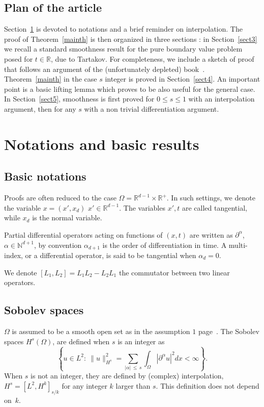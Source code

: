 \documentclass[AHL,Unicode,longabstracts,published]{cedram}
\newcommand{\R}{\mathbb{R}}
\newcommand{\N}{\mathbb{N}}
\newcommand{\N}{\mathbb{N}}
\begin{document}
\subsection{Plan of the article}
Section~\ref{notations} is devoted to notations and a brief reminder on interpolation. The proof of Theorem~\ref{mainth} is then organized in three sections : in Section~\ref{sect3} we recall a standard smoothness result for the pure boundary value problem posed for $t\in \R$, due to Tartakov. For completeness, we include a sketch of proof that follows an argument of the (unfortunately depleted) book~\cite{ChaPi}. Theorem~\ref{mainth} in the case $s$ integer is proved in Section~\ref{sect4}. An important point is a basic lifting lemma which proves to be also useful for the general case. In Section~\ref{sect5}, smoothness is first proved for $0\leq s\leq 1$ with an interpolation argument, then for any $s$ with a non trivial differentiation argument.



\section{Notations and basic results}\label{notations}

\subsection{Basic notations}
Proofs are often reduced to the case $\Omega=\R^{d-1}\times \R^+$. In such settings, we denote the variable $x=(x',x_d)$ $x'\in \R^{d-1}$. The variables $x',t$ are called tangential, while $x_d$ is the normal variable. 


Partial differential operators acting on functions of $(x,t)$ are written as $\partial^\alpha$, $\alpha\in \N^{d+1}$, by convention $\alpha_{d+1}$ is the order of differentiation in time. A multi-index, or a differential operator, is said to be tangential when $\alpha_d=0$.


We denote $[L_1,L_2]=L_1L_2-L_2L_1$ the commutator between two linear operators.

\subsection{Sobolev spaces}
$\Omega$ is assumed to be a smooth open set as in the assumption $1$ page~\pageref{assump1}. The Sobolev spaces $H^s(\Omega)$, are defined when $s$ is an integer as
\[
\left\{u\in L^2:\ \|u\|_{H^s}^2=
\sum_{|\alpha|\,\leq\,s}\int_\Omega|\partial^\alpha u|^2dx<\infty\right\}.
\]
When $s$ is not an integer, they are defined by (complex) interpolation, $H^s=[L^2,H^k]_{s/k}$ for any integer $k$ larger than $s$. This definition does not depend on~$k$.
\end{document}
